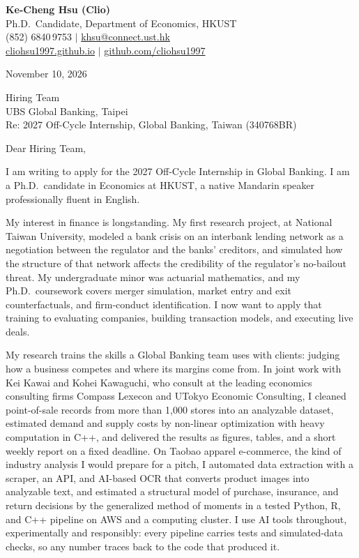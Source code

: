 \documentclass[11pt,letterpaper]{article}
\begin{document}
\noindent
{\bfseries Ke-Cheng Hsu (Clio)}\\
Ph.D.\ Candidate, Department of Economics, HKUST\\
(852) 6840\,9753 \quad $|$ \quad \href{mailto:khsu@connect.ust.hk}{khsu@connect.ust.hk}\\
\href{https://cliohsu1997.github.io/}{cliohsu1997.github.io} \quad $|$ \quad \href{https://github.com/cliohsu1997}{github.com/cliohsu1997}

\vspace{0.5em}
\noindent
November 10, 2026

\vspace{0.35em}
\noindent
Hiring Team\\
UBS Global Banking, Taipei\\
Re: 2027 Off-Cycle Internship, Global Banking, Taiwan (340768BR)

\vspace{0.2em}
Dear Hiring Team,

I am writing to apply for the 2027 Off-Cycle Internship in Global Banking. I am a Ph.D.\ candidate in Economics at HKUST, a native Mandarin speaker professionally fluent in English.

My interest in finance is longstanding. My first research project, at National Taiwan University, modeled a bank crisis on an interbank lending network as a negotiation between the regulator and the banks' creditors, and simulated how the structure of that network affects the credibility of the regulator's no-bailout threat. My undergraduate minor was actuarial mathematics, and my Ph.D.\ coursework covers merger simulation, market entry and exit counterfactuals, and firm-conduct identification. I now want to apply that training to evaluating companies, building transaction models, and executing live deals.

My research trains the skills a Global Banking team uses with clients: judging how a business competes and where its margins come from. In joint work with Kei Kawai and Kohei Kawaguchi, who consult at the leading economics consulting firms Compass Lexecon and UTokyo Economic Consulting, I cleaned point-of-sale records from more than 1{,}000 stores into an analyzable dataset, estimated demand and supply costs by non-linear optimization with heavy computation in C++, and delivered the results as figures, tables, and a short weekly report on a fixed deadline. On Taobao apparel e-commerce, the kind of industry analysis I would prepare for a pitch, I automated data extraction with a scraper, an API, and AI-based OCR that converts product images into analyzable text, and estimated a structural model of purchase, insurance, and return decisions by the generalized method of moments in a tested Python, R, and C++ pipeline on AWS and a computing cluster. I use AI tools throughout, experimentally and responsibly: every pipeline carries tests and simulated-data checks, so any number traces back to the code that produced it.
\end{document}
